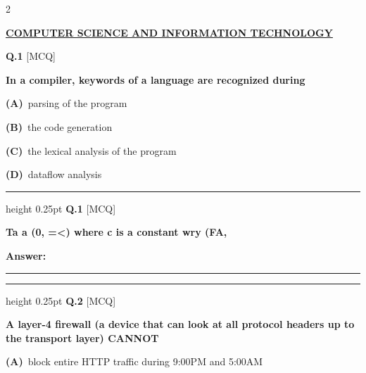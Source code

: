 \documentclass[a4paper,10pt,twoside]{article}
\begin{document}
\begin{multicols}{2}

\vspace{8pt}
\noindent\textbf{\large\underline{COMPUTER SCIENCE AND INFORMATION TECHNOLOGY}}\\[2pt]
\vspace{4pt}

\noindent\textbf{Q.1} \hfill {\footnotesize\textsf{[MCQ]}}
\par\vspace{2pt}
{\bfseries In a compiler, keywords of a language are recognized during \par}
\par\vspace{2pt}\noindent
\textbf{(A)}~parsing of the program\par\vspace{2pt}\noindent
\textbf{(B)}~the code generation\par\vspace{2pt}\noindent
\textbf{(C)}~the lexical analysis of the program\par\vspace{2pt}\noindent
\textbf{(D)}~dataflow analysis
\par\vspace{6pt}\hrule height 0.25pt\vspace{6pt}
\noindent\textbf{Q.1} \hfill {\footnotesize\textsf{[MCQ]}}
\par\vspace{2pt}
{\bfseries Ta a (0, =<) where c is a constant
wry (FA, \par}
\par\vspace{3pt}\noindent\textbf{Answer:} \rule{3.2cm}{0.4pt}
\par\vspace{6pt}\hrule height 0.25pt\vspace{6pt}
\noindent\textbf{Q.2} \hfill {\footnotesize\textsf{[MCQ]}}
\par\vspace{2pt}
{\bfseries A layer-4 firewall (a device that can look at all protocol headers up to the transport layer) CANNOT \par}
\par\vspace{2pt}\noindent
\textbf{(A)}~block entire HTTP traffic during 9:00PM and 5:00AM\par\vspace{2pt}\noindent

\end{multicols}
\end{document}
